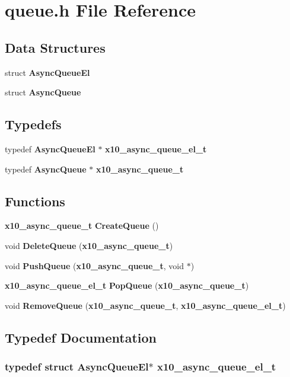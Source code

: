 \section{queue.h File Reference}
\label{queue_8h}
\subsection*{Data Structures}
\begin{CompactItemize}
\item 
struct {\bf Async\-Queue\-El}
\item 
struct {\bf Async\-Queue}
\end{CompactItemize}
\subsection*{Typedefs}
\begin{CompactItemize}
\item 
typedef {\bf Async\-Queue\-El} $\ast$ {\bf x10\_\-async\_\-queue\_\-el\_\-t}
\item 
typedef {\bf Async\-Queue} $\ast$ {\bf x10\_\-async\_\-queue\_\-t}
\end{CompactItemize}
\subsection*{Functions}
\begin{CompactItemize}
\item 
{\bf x10\_\-async\_\-queue\_\-t} {\bf Create\-Queue} ()
\item 
void {\bf Delete\-Queue} ({\bf x10\_\-async\_\-queue\_\-t})
\item 
void {\bf Push\-Queue} ({\bf x10\_\-async\_\-queue\_\-t}, void $\ast$)
\item 
{\bf x10\_\-async\_\-queue\_\-el\_\-t} {\bf Pop\-Queue} ({\bf x10\_\-async\_\-queue\_\-t})
\item 
void {\bf Remove\-Queue} ({\bf x10\_\-async\_\-queue\_\-t}, {\bf x10\_\-async\_\-queue\_\-el\_\-t})
\end{CompactItemize}


\subsection{Typedef Documentation}
\subsubsection{\setlength{\rightskip}{0pt plus 5cm}typedef struct {\bf Async\-Queue\-El}$\ast$ {\bf x10\_\-async\_\-queue\_\-el\_\-t}}\label{queue_8h_a0}


